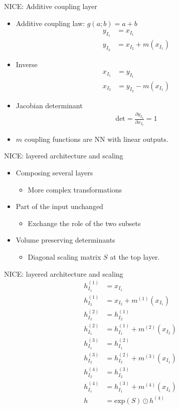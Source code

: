 \begin{frame}{NICE: Additive coupling layer}
\begin{itemize}
    \item Additive coupling law: $g(a; b) = a + b$
    \begin{align*}
                y_{I_1} &= x_{I_1} \\
                y_{I_2} &= x_{I_2} + m(x_{I_1})
    \end{align*}
    \item Inverse
    \begin{align*}
                x_{I_1} &= y_{I_1} \\
                x_{I_2} &= y_{I_2} - m(x_{I_1})
    \end{align*}
    \item Jacobian determinant
    \begin{align*}
        \text{det} = \frac{\partial y_{I_2}}{\partial x_{I_2}} = 1
    \end{align*}
    \item $m$ coupling functions are NN with linear outputs.
\end{itemize}
\end{frame}
\begin{frame}{NICE: layered architecture and scaling}
    \begin{itemize}
        \item Composing several layers
        \begin{itemize}
            \item More complex transformations
        \end{itemize}
        \item Part of the input unchanged
        \begin{itemize}
            \item Exchange the role of the two subsets
        \end{itemize}
        \item Volume preserving determinants
        \begin{itemize}
            \item Diagonal scaling matrix $S$ at the top layer.
        \end{itemize}
    \end{itemize}
\end{frame}
\begin{frame}{NICE: layered architecture and scaling}
\begin{align*}
    h_{I_1}^{(1)} &= x_{I_1}\\
    h_{I_2}^{(1)} &= x_{I_2} + m^{(1)}(x_{I_1})\\ 
    h_{I_2}^{(2)} &= h_{I_2}^{(1)}\\
    h_{I_1}^{(2)} &= h_{I_1}^{(1)} + m^{(2)}(x_{I_2})\\ 
    h_{I_1}^{(3)} &= h_{I_1}^{(2)}\\
    h_{I_2}^{(3)} &= h_{I_2}^{(2)} + m^{(3)}(x_{I_1})\\ 
    h_{I_2}^{(4)} &= h_{I_2}^{(3)}\\
    h_{I_1}^{(4)} &= h_{I_1}^{(3)} + m^{(4)}(x_{I_2})\\ 
    h &= \text{exp}(S) \odot h^{(4)}
\end{align*}
\end{frame}
